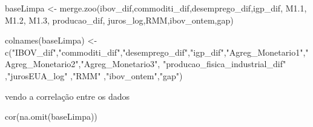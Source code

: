 \documentclass[
]{article}
\newenvironment{Shaded}{\begin{snugshade}}{\end{snugshade}}
\newcommand{\FloatTok}[1]{\textcolor[rgb]{0.00,0.00,0.81}{#1}}
\newcommand{\FunctionTok}[1]{\textcolor[rgb]{0.00,0.00,0.00}{#1}}
\newcommand{\NormalTok}[1]{#1}
\newcommand{\OtherTok}[1]{\textcolor[rgb]{0.56,0.35,0.01}{#1}}
\newcommand{\StringTok}[1]{\textcolor[rgb]{0.31,0.60,0.02}{#1}}
\begin{document}
\begin{Shaded}
\begin{Highlighting}[]
\NormalTok{baseLimpa }\OtherTok{\textless{}{-}} \FunctionTok{merge.zoo}\NormalTok{(ibov\_dif,commoditi\_dif,desemprego\_dif,igp\_dif, M1}\FloatTok{.1}\NormalTok{, M1}\FloatTok{.2}\NormalTok{, M1}\FloatTok{.3}\NormalTok{, producao\_dif, juros\_log,RMM,ibov\_ontem,gap)}

\FunctionTok{colnames}\NormalTok{(baseLimpa) }\OtherTok{\textless{}{-}} \FunctionTok{c}\NormalTok{(}\StringTok{"IBOV\_dif"}\NormalTok{,}\StringTok{"commoditi\_dif"}\NormalTok{,}\StringTok{"desemprego\_dif"}\NormalTok{,}\StringTok{"igp\_dif"}\NormalTok{,}\StringTok{"Agreg\_Monetario1"}\NormalTok{,}\StringTok{"Agreg\_Monetario2"}\NormalTok{,}\StringTok{"Agreg\_Monetario3"}\NormalTok{, }\StringTok{"producao\_fisica\_industrial\_dif"}\NormalTok{ ,}\StringTok{"jurosEUA\_log"}\NormalTok{ ,}\StringTok{"RMM"}\NormalTok{ ,}\StringTok{"ibov\_ontem"}\NormalTok{,}\StringTok{"gap"}\NormalTok{)}
\end{Highlighting}
\end{Shaded}

vendo a correlação entre os dados

\begin{Shaded}
\begin{Highlighting}[]
\FunctionTok{cor}\NormalTok{(}\FunctionTok{na.omit}\NormalTok{(baseLimpa))}
\end{Highlighting}
\end{Shaded}
\end{document}
